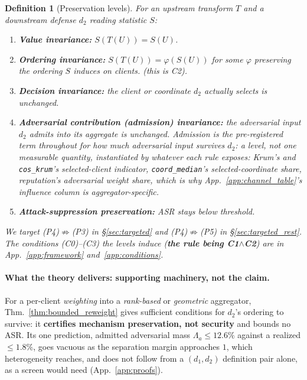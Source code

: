 \documentclass{article}
\newtheorem{definition}{Definition}
\begin{document}
\begin{definition}[Preservation levels]
\label{def:levels}
For an upstream transform $T$ and a downstream defense $d_2$ reading statistic $S$:
\begin{enumerate}[noitemsep,topsep=2pt,label=(P\arabic*)]
\item \textbf{Value invariance:} $S(T(U)) = S(U)$.
\item \textbf{Ordering invariance:} $S(T(U)) = \varphi(S(U))$ for some $\varphi$ preserving the ordering $S$ induces on clients. \emph{(this is C2)}.
\item \textbf{Decision invariance:} the client or coordinate $d_2$ actually selects is unchanged.
\item \textbf{Adversarial contribution (admission) invariance:} the adversarial input $d_2$ admits into its aggregate is unchanged. \emph{Admission} is the pre-registered term throughout for how much adversarial input survives $d_2$: a level, not one measurable quantity, instantiated by whatever each rule exposes: Krum's and \texttt{cos\_krum}'s selected-client indicator, \texttt{coord\_median}'s selected-coordinate share, reputation's adversarial weight share, which is why App.~\ref{app:channel_table}'s influence column is aggregator-specific.
\item \textbf{Attack-suppression preservation:} ASR stays below threshold.
\end{enumerate}
We target (P4)$\not\Rightarrow$(P3) in \S\ref{sec:targeted} and (P4)$\not\Rightarrow$(P5) in \S\ref{sec:targeted_rest}. The conditions (C0)--(C3) the levels induce (\textbf{the rule being C1$\wedge$C2}) are in App.~\ref{app:framework} and~\ref{app:conditions}.
\end{definition}

\paragraph{What the theory delivers: supporting machinery, not the claim.} For a per-client \emph{weighting} into a \emph{rank-based} or \emph{geometric} aggregator, Thm.~\ref{thm:bounded_reweight} gives sufficient conditions for $d_2$'s ordering to survive: it \textbf{certifies mechanism preservation, not security} and bounds no ASR. Its one prediction, admitted adversarial mass $\Lambda_a \leq 12.6\%$ against a realized $\leq 1.8\%$, goes vacuous as the separation margin approaches $1$, which heterogeneity reaches, and does not follow from a $(d_1,d_2)$ definition pair alone, as a screen would need (App.~\ref{app:proofs}).
\end{document}
